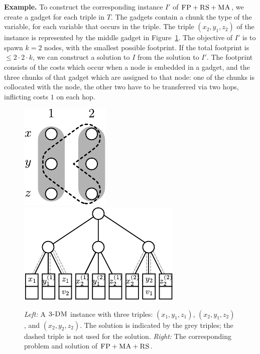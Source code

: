 \documentclass[9pt]{sigcomm-alternate}
\newcommand{\FP}{\textsc{FP}}
\newcommand{\RS}{\textsc{RS}}
\newcommand{\MA}{\textsc{MA}}
\newcommand{\TDM}{\textsc{3-DM}}
\begin{document}
\textbf{Example.} To construct the corresponding instance $I'$ of $\FP+\RS+\MA$, we
create a gadget for each triple in $T$. The gadgets contain a chunk  the
type of the variable, for each variable that occurs in the triple. The triple
$(x_2, y_1, z_2)$ of the instance is represented by the middle gadget in
Figure~\ref{fig:fprsma}. The objective of $I'$ is to spawn $k=2$ nodes,
with the smallest possible footprint. If the total footprint is $\leq
2\cdot2\cdot k$, we can construct a solution to $I$ from the solution to $I'$.
The footprint consists of the costs which occur when a node is embedded in a
gadget, and the three chunks of that gadget which are assigned to that node: one of
the chunks is collocated with the node, the other two have to be transferred
via two hops, inflicting costs $1$ on each hop.
\begin{figure}[t]
\includegraphics[width = 0.3\columnwidth]{figs/np_3dm_formular}
\hfill
\includegraphics[width = 0.6\columnwidth]{figs/np_3dm_construction}
\caption{\textit{Left:} A $\TDM$ instance with three triples:
$(x_1, y_1, z_1)$, $(x_2, y_1, z_2)$, and $(x_2, y_2, z_2)$. The solution is
indicated by the grey triples; the dashed triple is not used for the
solution. \textit{Right:} The corresponding problem and solution of $\FP + \MA
+ \RS$.}
\label{fig:fprsma}
\end{figure}
\end{document}
